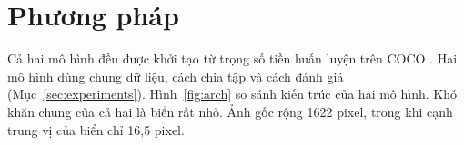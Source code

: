 
\section{Phương pháp}
\label{sec:method}

Cả hai mô hình đều được khởi tạo từ trọng số tiền huấn luyện trên COCO \citep{lin2014coco}. Hai mô hình dùng chung dữ liệu, cách chia tập và cách đánh giá (Mục~\ref{sec:experiments}).
Hình~\ref{fig:arch} so sánh kiến trúc của hai mô hình.
Khó khăn chung của cả hai là biển rất nhỏ. Ảnh gốc rộng 1622 pixel, trong khi cạnh trung vị của biển chỉ 16,5 pixel.

